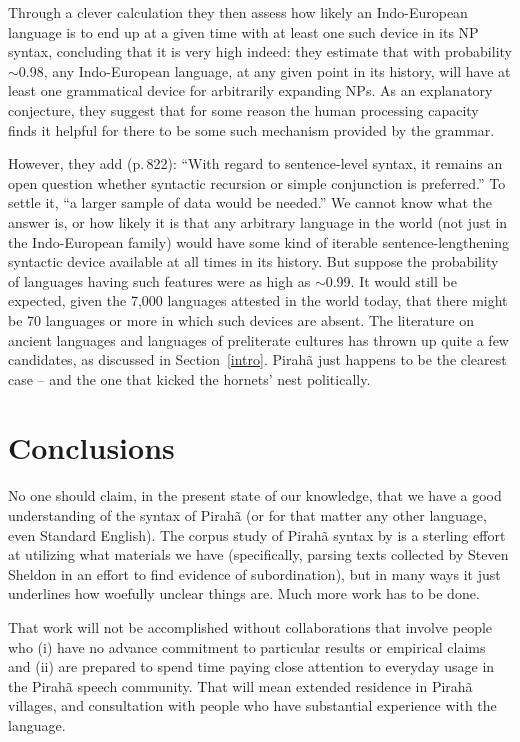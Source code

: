 \documentclass[output=paper,colorlinks,citecolor=brown
]{langscibook}
\begin{document}
Through a clever calculation they then assess how likely an Indo-European
language is to end up at a given time with at least one such device in
its NP syntax, concluding that it is very high indeed: they estimate
that with probability $\sim$0.98, any Indo-European language, at any
given point in its history, will have at least one grammatical device
for arbitrarily expanding NPs. As an explanatory conjecture, they suggest
that for some reason the human processing capacity finds it helpful for
there to be some such mechanism provided by the grammar.

However, they add (p.\,822): ``With regard to sentence-level syntax,
it remains an open question whether syntactic recursion or simple
conjunction is preferred.'' To settle it, ``a larger sample of data
would be needed.'' We cannot know what the answer is, or how likely
it is that any arbitrary language in the world (not just in the
Indo-European family) would have some kind of iterable
sentence-lengthening syntactic device available at all times in its
history. But suppose the probability of languages having such features
were as high as $\sim$0.99. It would still be expected, given the
7,000 languages attested in the world today, that there might be 70
languages or more in which such devices are absent. The literature
on ancient languages and languages of preliterate cultures has thrown
up quite a few candidates, as discussed in Section~\ref{intro}.
Pirah{\~a} just happens to be the clearest case -- and the one that
kicked the hornets' nest politically.

\section{Conclusions}

No one should claim, in the present state of our knowledge, that we
have a good understanding of the syntax of Pirah{\~a} (or for that
matter any other language, even Standard English). The corpus study
of Pirah{\~a} syntax by \citet{FutrellEtAl16} is a sterling effort
at utilizing what materials we have (specifically, parsing texts
collected by Steven Sheldon in an effort to find evidence of
subordination), but in many ways it just underlines how woefully
unclear things are. Much more work has to be done.

That work will not be accomplished without collaborations that involve
people who (i) have no advance commitment to particular results or
empirical claims and (ii) are prepared to spend time paying close
attention to everyday usage in the Pirah{\~a} speech community. That
will mean extended residence in Pirah{\~a} villages, and consultation
with people who have substantial experience with the language.
\end{document}

